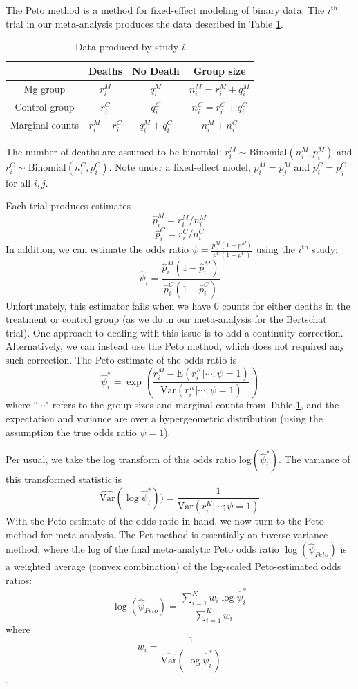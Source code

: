 \documentclass[fleqn,10pt]{SelfArx} %
\begin{document}
The Peto method is a method for fixed-effect modeling of binary data. The $i^{\textrm{th}}$ trial in our meta-analysis produces the data described in Table \ref{tab:sld}. 
\bgroup
\def\arraystretch{1.2}
\begin{table}[H]
\caption{Data produced by study $i$} \label{tab:sld}
\begin{center}
\begin{tabular}{| c | c | c | c |}
\hline
	& Deaths & No Death & Group size \\
\hline
Mg group &  $r_i^M$ & $q_i^M$ & $n_i^M = r_i^M + q_i^M$\\
\hline
Control group &  $r_i^C$ & $q_i^C$ & $n_i^C = r_i^C + q_i^C$  \\
\hline
Marginal counts & $r_i^M + r_i^C$ & $q_i^M + q_i^C$ & $n_i^M + n_i^C$ \\
\hline
\end{tabular}
\end{center}
\end{table}
\egroup
The number of deaths are assumed to be binomial: $r_i^M \sim \textrm{Binomial}(n_i^M, p_i^M)$ and $r_i^C \sim \textrm{Binomial}(n_i^C, p_i^C)$. Note under a fixed-effect model, $p_i^M = p_j^M$ and $p_i^C = p_j^C$ for all $i, j$.

Each trial produces estimates
\[\hat{p}_i^M = r_i^M/n_i^M\]
\[\hat{p}_i^C = r_i^C / n_i^C\]
In addition, we can estimate the odds ratio $\psi = \frac{p^M (1- p^M)}{p^C (1 - p^C)}$ using the $i^{\textrm{th}}$ study:
\[\hat{\psi}_i = \frac{\hat{p}_i^M(1-\hat{p}_i^M)}{\hat{p}_i^C(1-\hat{p}_i^C)}\]
Unfortunately, this estimator fails when we have 0 counts for either deaths in the treatment or control group (as we do in our meta-analysis for the Bertschat trial). One approach to dealing with this issue is to add a continuity correction. Alternatively, we can instead use the Peto method, which does not required any such correction. The Peto estimate of the odds ratio is
\[\hat{\psi}_i^* = \exp\left(\frac{r_i^M - \textrm{E}(r_i^K | \cdots; \psi = 1)}{\textrm{Var}(r_i^K | \cdots; \psi = 1)}\right)\]
where ``$\cdots$" refers to the group sizes and marginal counts from Table \ref{tab:sld}, and the expectation and variance are over a hypergeometric distribution (using the assumption the true odds ratio $\psi = 1$).

Per usual, we take the log transform of this odds ratio log$(\hat{\psi}_i^*)$. The variance of this transformed statistic is
\[\widehat{\textrm{Var}}(\log \hat{\psi}_i^*)) = \frac{1}{\textrm{Var}(r_i^K | \cdots; \psi = 1)}\]
With the Peto estimate of the odds ratio in hand, we now turn to the Peto method for meta-analysis. The Pet method is essentially an inverse variance method, where the log of the final meta-analytic Peto odds ratio $\log(\hat{\psi}_{Peto})$ is a weighted average (convex combination) of the log-scaled Peto-estimated odds ratios:
\[\log(\hat{\psi}_{Peto}) = \frac{\sum_{i = 1}^K w_i \log \hat{\psi}_i^*}{\sum_{i = 1}^K w_i} \]
where
\[w_i = \frac{1}{\widehat{\textrm{Var}}(\log \hat{\psi}_i^*)}\].
\end{document}
